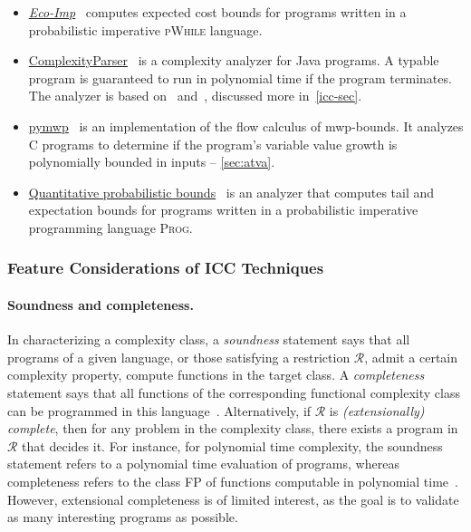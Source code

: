 \begin{itemize}
\item \href{https://www-sop.inria.fr/members/Martin.Avanzini/software/eco-imp/}%
      {\emph{Eco-Imp}}~\cite{avanzini2020}
      computes expected cost bounds for programs written in a probabilistic imperative \textsc{pWhile} language.

\item \href{https://gitlab.inria.fr/complexityparser/complexityparser/-/tree/master}{{ComplexityParser}}~\cite{hainry2021}
      is a complexity analyzer for Java programs.
      A typable program is guaranteed to run in polynomial time if the program terminates.
      The analyzer is based on~\cite{hainry2015} and~\cite{hainry2018}, discussed more in~\autoref{icc-sec}.

\item \href{https://github.com/statycc/pymwp}{{pymwp}}~\cite{aubert2023b}
      is an implementation of the flow calculus of mwp-bounds.
      It analyzes C programs to determine if the program's variable value growth is polynomially bounded in inputs -- \autoref{sec:atva}.

\item \href{https://zenodo.org/records/10457566}{{Quantitative probabilistic bounds}}~\cite{chatterjee2024}
      is an analyzer that computes tail and expectation bounds for programs written in a probabilistic imperative programming language \textsc{Prog}.

\end{itemize}

\subsubsection{Feature Considerations of ICC Techniques}\label{icc-feat}

\paragraph*{Soundness and completeness.}
In characterizing a complexity class,
a \emph{soundness} statement says that all programs of a given language, or those satisfying a restriction \(\mathcal{R}\), admit a certain complexity property, \ie compute functions in the target class.
A \emph{completeness} statement says that all functions of the corresponding functional complexity class can be programmed in this language~\cite{baillot2012}.
Alternatively, if \(\mathcal{R}\) is \emph{(extensionally) complete}, then for any problem in the complexity class, there exists a program in \(\mathcal{R}\) that decides it.
For instance, for polynomial time complexity, the soundness statement refers to a polynomial time evaluation of programs, whereas completeness refers to the class FP of functions computable in polynomial time~\cite{baillot2012}.
However, extensional completeness is of limited interest, as the goal is to validate as many interesting programs as possible.

